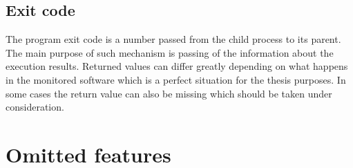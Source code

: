 \documentclass[a4paper,twoside,12pt]{book}
\begin{document}
\subsection{Exit code}

The program exit code is a number passed from the child process to its parent. The main purpose 
of such mechanism is passing of the information about the execution results. Returned values
can differ greatly depending on what happens in the monitored software which is a perfect situation
for the thesis purposes. In some cases the return value can also be missing which should be taken 
under consideration.

\section{Omitted features}
\end{document}
